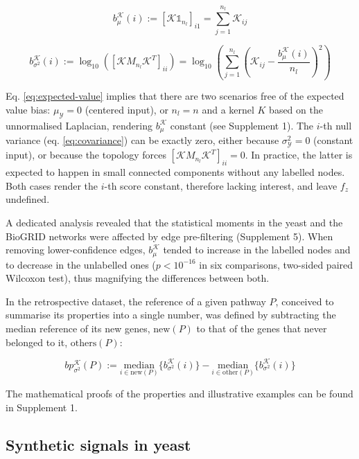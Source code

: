 \documentclass[final]{bioinfo}
\newcommand{\ebias}{b_{\mu}^{\mathcal{K}}}
\newcommand{\vbias}{b_{\sigma^2}^{\mathcal{K}}}
\newcommand{\pbias}{bp_{\sigma^2}^{\mathcal{K}}}
\begin{document}
\begin{equation}\label{eq:bias-e}
    \ebias(i) := [\mathcal{K} \mathbb{1}_{n_l}]_{i1} = \sum_{j = 1}^{n_l} \mathcal{K}_{ij}
\end{equation}

\begin{equation}\label{eq:bias-var}
    \vbias(i) := \log_{10} \left(\left[\mathcal{K} M_{n_l} \mathcal{K}^T\right]_{ii}\right) = \log_{10} \left( \sum_{j = 1}^{n_l} \left(\mathcal{K}_{ij} - \frac{\ebias(i)}{n_l} \right)^2 \right)
\end{equation}

Eq. \ref{eq:expected-value} implies that there are two scenarios free of the expected value bias: $\mu_{\mathcal{Y}} = 0$ (centered input), or $n_l = n$ and a kernel $K$ based on the unnormalised Laplacian, rendering $\ebias$ constant (see Supplement 1).
The $i$-th null variance (eq. \ref{eq:covariance}) can be exactly zero, either because $\sigma_{\mathcal{Y}}^2 = 0$ (constant input), or because the topology forces $[\mathcal{K} M_{n_l} \mathcal{K}^T]_{ii} = 0$.
In practice, the latter is expected to happen in small connected components without any labelled nodes.
Both cases render the $i$-th score constant, therefore lacking interest, and leave $f_z$ undefined.

A dedicated analysis revealed that the statistical moments in the yeast and the BioGRID networks were affected by edge pre-filtering (Supplement 5).
When removing lower-confidence edges, $\ebias$ tended to increase in the labelled nodes and to decrease in the unlabelled ones ($p<10^{-16}$ in six comparisons, two-sided paired Wilcoxon test), thus magnifying the differences between both.

In the retrospective dataset, the reference of a given pathway $P$, conceived to summarise its properties into a single number, was defined by subtracting the median reference of its new genes, $\textrm{new}(P)$ to that of the genes that never belonged to it, $\textrm{others}(P)$:

\begin{equation}\label{eq:bias-var-pathway}
    \pbias(P) := \underset{i \in \textrm{new}(P)}{\textrm{median}}\{\vbias(i)\} - \underset{i \in \textrm{other}(P)}{\textrm{median}}\{\vbias(i)\}
\end{equation}

The mathematical proofs of the properties and illustrative examples can be found in Supplement 1. 

\subsection*{Synthetic signals in yeast}
\end{document}
